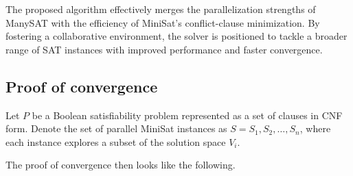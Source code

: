 \documentclass{article}
\begin{document}
The proposed algorithm effectively merges the parallelization strengths of ManySAT with the efficiency of MiniSat’s conflict-clause minimization. By fostering a collaborative environment, the solver is positioned to tackle a broader range of SAT instances with improved performance and faster convergence.

\subsection{Proof of convergence}

Let $P$ be a Boolean satisfiability problem represented as a set of clauses in CNF form. Denote the set of parallel MiniSat instances as $S={S_1,S_2,…,S_n}$, where each instance explores a subset of the solution space $V_i$.

The proof of convergence then looks like the following.
\end{document}
